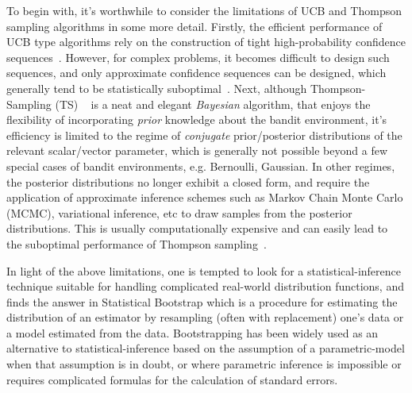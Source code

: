\documentclass[10pt]{article}
\begin{document}
To begin with, it’s worthwhile to consider the limitations of UCB and Thompson sampling algorithms in some more detail.  Firstly, the  efficient performance of UCB type algorithms rely on the construction of tight high-probability confidence sequences~\citep{abbasi2011regret,auer2002finite}. However, for complex problems, it becomes difficult to design such sequences, and only approximate confidence sequences can be designed, which generally tend to be statistically suboptimal~\citep{filippi2010parametric}. Next, although  Thompson-Sampling (TS) ~\citep{thompson1933likelihood,kaufmann2012thompson} is a neat and elegant \textit{Bayesian} algorithm, that enjoys the flexibility of incorporating \textit{prior} knowledge about the bandit environment, it's efficiency is limited to the regime of \textit{conjugate} prior/posterior distributions of the relevant scalar/vector parameter, which is generally not possible beyond a few special cases of bandit environments, e.g. Bernoulli, Gaussian. In other regimes, the posterior distributions no longer exhibit a closed form, and require the application of approximate inference schemes such as Markov Chain Monte Carlo (MCMC), variational inference, etc to draw samples from the posterior distributions.  This is usually computationally expensive and can easily lead to the suboptimal performance of Thompson sampling~\citep{phan2019thompson}. 

 

In light of the above limitations, one is tempted to look for a statistical-inference technique suitable for handling complicated real-world distribution functions, and finds the answer in Statistical Bootstrap which is a procedure for estimating the distribution of an estimator by resampling (often with replacement) one's data or a model estimated from the data. Bootstrapping has been widely used as an alternative to statistical-inference based on the assumption of a parametric-model when that assumption is in doubt, or where parametric inference is impossible or requires complicated formulas for the calculation of standard errors. 
\end{document}
